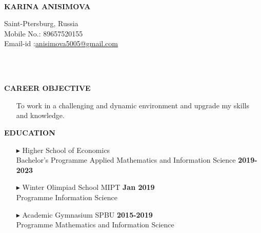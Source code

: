\documentclass[a4paper,10pt]{article}
\begin{document}
	\hspace{0.5cm}\\[-0.2cm]
	\begin{minipage}{0.5\textwidth}
		\begin{flushleft}
			\huge \textbf{\* \* KARINA ANISIMOVA} 
			\normalsize
		\end{flushleft}
	\end{minipage}
	\begin{minipage}{0.51\textwidth}
		\begin{flushright}
			\textcolor[gray]{0.3}{
				\indent Saint-Ptersburg, Russia\\
				\indent Mobile No.: 89657520155  \\
				\indent Email-id :\href{mailto:anisimova5005@gmail.com} {anisimova5005@gmail.com}\\  	
			}
		\end{flushright}
	\end{minipage}
    \\ \\
    
    
    \colorbox{magicmint}{
		\begin{minipage}{0.96\textwidth}
			\textbf{CAREER OBJECTIVE}
		\end{minipage}
	}
	\begin{itemize}
		\item[]To work in a challenging and dynamic environment and upgrade my skills and knowledge.
	\end{itemize}

	 \colorbox{magicmint}{
		\begin{minipage}{0.96\textwidth}
			\textbf{EDUCATION}
		\end{minipage}
	}

	\begin{itemize}
		\item [$\blacktriangleright$]  Higher School of Economics\\ Bachelor’s Programme Applied Mathematics and Information Science \hspace{3.9cm} \textbf{2019-2023}
		\item[$\blacktriangleright$]  Winter Olimpiad School MIPT \hspace{10.4cm}\textbf{Jan 2019} \\ Programme Information Science 
		\item[$\blacktriangleright$]  Academic Gymnasium SPBU \hspace{10.4cm}\textbf{2015-2019} \\ Programme Mathematics and Information Science 
	\end{itemize}
	
\end{document}

